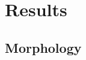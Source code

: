 \section{Results} \label{sec:res}

\subsection{Morphology}
\begin{comment}

对彗核的许多物理参数的表征（如旋转状态、喷流活动的位置）和彗核中发生的物理过程的量化是基于对彗星核各向异性发射特征的空间和时间观测实现的。然而，在许多情况下，这些彗发特征只是比背景值高几个百分点，需要通过增强技术来识别与测量。

目前，主要使用的增强技术可分为以下几类：
\begin{enumerate}
	\item 通过简单的对比拉伸的方式展现出彗发的形态特征
	\item 通过去除背景的方式展示彗发特征
	\item 通过空间滤波的方式增强空间不连续性
	\item 通过空间导数的方式增强空间不连续性
\end{enumerate}

\begin{shaded}

原始图像合并，包含多个波段。

一些图像PSF减星不够完美，因此会留下黑色痕迹。

C/2020 P3 非常微弱，在此用白色圆圈出来(circled in white color)。但能辨识(identify)出延展的彗发

north at the top, east to the left
\end{shaded}
\end{comment}

